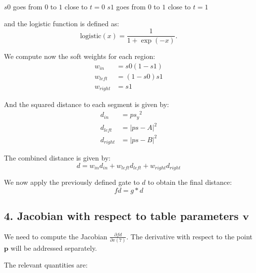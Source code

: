 \documentclass[11pt]{article}
\begin{document}
        $s0$ goes from $0$ to $1$ close to $t=0$
        $s1$ goes from $0$ to $1$ close to $t=1$

        and the logistic function is defined as:
        \begin{equation}
            \text{logistic}(x) = \frac{1}{1+\exp(-x)}.
        \end{equation}

        We compute now the soft weights for each region:
       \begin{align*}
            w_{in} &= s0 (1- s1) \\
            w_{left} &= (1-s0) s1 \\
            w_{right} &= s1
       \end{align*}

        And the squared distance to each segment is given by:
        \begin{align*}
            d_{in} &= ps{_y}^2 \\
            d_{left} &= |ps - A|^2 \\
            d_{right} &= |ps - B|^2
        \end{align*}

        The combined distance is given by:
        \begin{equation}
            d = w_{in} d_{in} + w_{left} d_{left} + w_{right} d_{right}
        \end{equation}

        We now apply the previously defined gate to $d$ to obtain the final distance:
        \begin{equation}
            fd = g * d
        \end{equation}

        \subsection*{4. Jacobian with respect to table parameters \(\mathbf{v}\)}

            We need to compute the Jacobian $\frac{\partial fd}{\partial v(7)}$.
            The derivative with respect to the point $\mathbf{p}$ will be addressed separately.

            The relevant quantities are:
\end{document}
